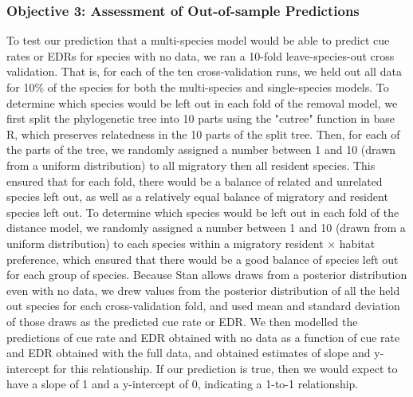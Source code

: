 \documentclass[12pt]{article}
\begin{document}
\subsubsection{Objective 3: Assessment of Out-of-sample Predictions}
\par To test our prediction that a multi-species model would be able to predict cue rates or EDRs for species with no data, we ran a 10-fold leave-species-out cross validation.
That is, for each of the ten cross-validation runs, we held out all data for 10\% of the species for both the multi-species and single-species models.
To determine which species would be left out in each fold of the removal model, we first split the phylogenetic tree into 10 parts using the "cutree" function in base R, which preserves relatedness in the 10 parts of the split tree.
Then, for each of the parts of the tree, we randomly assigned a number between 1 and 10 (drawn from a uniform distribution) to all migratory then all resident species.
This ensured that for each fold, there would be a balance of related and unrelated species left out, as well as a relatively equal balance of migratory and resident species left out.
To determine which species would be left out in each fold of the distance model, we randomly assigned a number between 1 and 10 (drawn from a uniform distribution) to each species within a migratory resident $\times$ habitat preference, which ensured that there would be a good balance of species left out for each group of species.
Because Stan allows draws from a posterior distribution even with no data, we drew values from the posterior distribution of all the held out species for each cross-validation fold, and used mean and standard deviation of those draws as the predicted cue rate or EDR.
We then modelled the predictions of cue rate and EDR obtained with no data as a function of cue rate and EDR obtained with the full data, and obtained estimates of slope and y-intercept for this relationship.
If our prediction is true, then we would expect to have a slope of 1 and a y-intercept of 0, indicating a 1-to-1 relationship.
\end{document}
